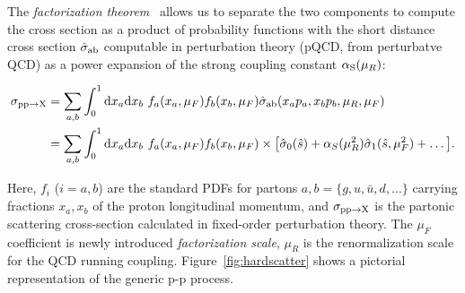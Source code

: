 The {\it factorization theorem}~\cite{Campbell:2006wx} allows us to separate the 
two components to compute the cross section as a product of probability functions with
the short distance cross section $\hat{\sigma}_{\rm ab}$ computable in perturbation
theory (pQCD, from perturbatve QCD) as a power expansion of the strong coupling constant $\alphas(\mu_R)$:

\begin{equation}
\begin{split}
  \sigma_{{\rm pp}\to{\rm X}}
  & = \sum_{a,b}%
  \int_{0}^{1}{\rm d}x_a{\rm d}x_b
  ~ f_a(x_a,\mu_{F}) f_b(x_b,\mu_{F})
  \hat{\sigma}_{\rm ab}(x_ap_a, x_bp_b,\mu_R,\mu_{F}) \\
  & = \sum_{a,b}%
  \int_{0}^{1}{\rm d}x_a{\rm d}x_b
  ~ f_a(x_a,\mu_{F}) f_b(x_b,\mu_{F})
  \times {\left[ \hat{\sigma}_{0}(\hat{s}) + \alpha_{S}(\mu_{R}^{2})\hat{\sigma}_{1}(\hat{s},\mu_{F}^{2}) + \dots \right]}. \\
\end{split}
\label{eq:QCDCrossSection}
\end{equation}

Here, $f_i$ ($i=a,b$) are the standard PDFs for partons $a,b = \{g,u,\bar{u},d,...\}$ carrying fractions $x_a,x_b$ 
of the proton longitudinal momentum, and $\sigma_{{\rm pp}\to{\rm X}}$ is the partonic scattering cross-section 
calculated in fixed-order perturbation theory. The $\mu_{F}$ coefficient is newly introduced {\it factorization scale}, 
$\mu_{R}$ is the renormalization scale for the QCD running coupling. Figure~\ref{fig:hardscatter} shows a pictorial
representation of the generic p-p process.


